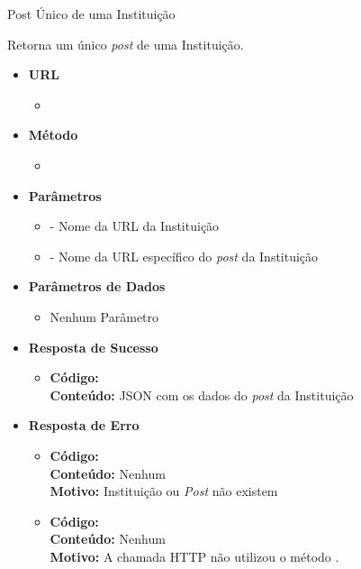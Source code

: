 \begin{caixa}{Post Único de uma Instituição}{}

Retorna um único \emph{post} de uma Instituição.

\begin{itemize}
\item \textbf{URL}
	\begin{itemize}
		\item {}
	\end{itemize}

\item \textbf{Método}
	\begin{itemize}
		\item {}
	\end{itemize}

\item \textbf{Parâmetros}
	\begin{itemize}
		\item {} - Nome da URL da Instituição
        \item {} - Nome da URL específico do \emph{post} da Instituição
	\end{itemize}

\item \textbf{Parâmetros de Dados}
	\begin{itemize}
		\item Nenhum Parâmetro
	\end{itemize}

\item \textbf{Resposta de Sucesso}
	\begin{itemize}
		\item \textbf{Código:}  \\ \textbf{Conteúdo:} JSON com os dados do \emph{post} da Instituição
	\end{itemize}

\item \textbf{Resposta de Erro}
	\begin{itemize}
		\item \textbf{Código:}  \\ \textbf{Conteúdo:} Nenhum \\ \textbf{Motivo:} Instituição ou \emph{Post} não existem
        \item \textbf{Código:}  \\ \textbf{Conteúdo:} Nenhum \\ \textbf{Motivo:} A chamada HTTP não utilizou o método .
	\end{itemize}

\end{itemize}
\end{caixa}

